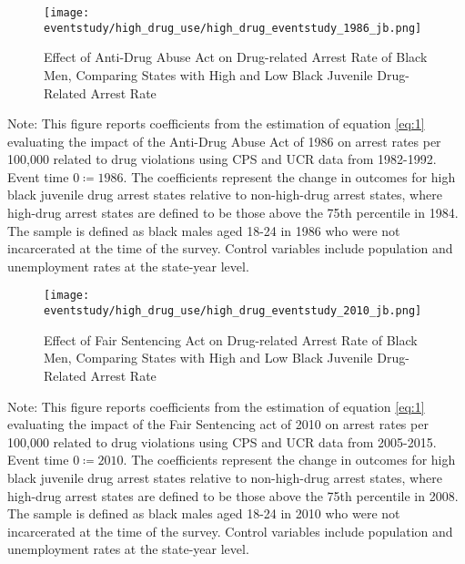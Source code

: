 \clearpage

  \begin{figure}[h]
    \caption{Effect of Anti-Drug Abuse Act on Drug-related Arrest Rate of Black Men, Comparing States with High and Low Black Juvenile Drug-Related Arrest Rate}
    \centering
    \texttt{[image: eventstudy/high\_drug\_use/high\_drug\_eventstudy\_1986\_jb.png]}
    \label{fig:jb_es_1986}
  \end{figure}

  \begin{footnotesize}
    \noindent Note: This figure reports coefficients from the estimation of equation \ref{eq:1} evaluating the impact of the Anti-Drug Abuse Act of 1986 on arrest rates per 100,000 related to drug violations using CPS and UCR data from 1982-1992. Event time $0 \coloneqq 1986$. The coefficients represent the change in outcomes for high black juvenile drug arrest states relative to non-high-drug arrest states, where high-drug arrest states are defined to be those above the 75th percentile in 1984. The sample is defined as black males aged 18-24 in 1986 who were not incarcerated at the time of the survey. Control variables include population and unemployment rates at the state-year level. 
  \end{footnotesize}

\clearpage

\begin{figure}[h]
    \caption{Effect of Fair Sentencing Act on Drug-related Arrest Rate of Black Men, Comparing States with High and Low Black Juvenile Drug-Related Arrest Rate}
    \centering
    \texttt{[image: eventstudy/high\_drug\_use/high\_drug\_eventstudy\_2010\_jb.png]}
    \label{fig:jb_es_2010}
  \end{figure}

  \begin{footnotesize}
    \noindent Note: This figure reports coefficients from the estimation of equation \ref{eq:1} evaluating the impact of the Fair Sentencing act of 2010 on arrest rates per 100,000 related to drug violations using CPS and UCR data from 2005-2015. Event time $0 \coloneqq 2010$. The coefficients represent the change in outcomes for high black juvenile drug arrest states relative to non-high-drug arrest states, where high-drug arrest states are defined to be those above the 75th percentile in 2008. The sample is defined as black males aged 18-24 in 2010 who were not incarcerated at the time of the survey. Control variables include population and unemployment rates at the state-year level. 
  \end{footnotesize}

